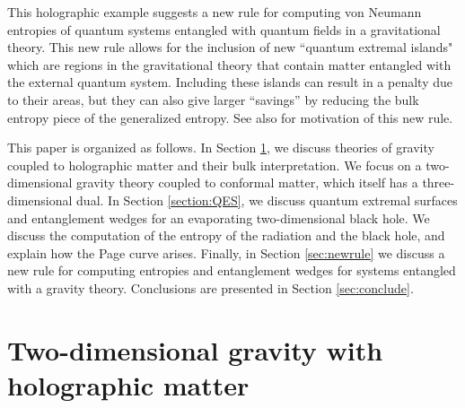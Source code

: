 \documentclass[11pt]{article}
\def\la{\label}
\begin{document}
This holographic example suggests a new rule for computing von Neumann entropies of quantum systems entangled with quantum fields  in a gravitational theory. 
This new rule allows for the inclusion of new ``quantum extremal islands" which are regions in the gravitational theory that contain matter entangled with the external quantum system. 
Including these islands can result in a penalty due to their areas, but they can also give larger ``savings'' by reducing the bulk entropy piece of the generalized entropy. 
See also \cite{Hayden:2018khn,Penington:2019npb}  for motivation of this new rule.

This paper is organized as follows. 
In Section \ref{sec:setup}, we discuss theories of gravity coupled to holographic matter and their bulk interpretation. 
We focus on a two-dimensional gravity theory coupled to conformal matter, which itself has a three-dimensional dual. 
In Section \ref{section:QES}, we discuss quantum extremal surfaces and entanglement wedges for an evaporating two-dimensional black hole. 
We discuss the computation of the entropy of the radiation and the black hole, and explain how the Page curve arises.
Finally, in Section \ref{sec:newrule} we discuss a new rule for computing entropies and entanglement wedges for systems entangled with a gravity theory.  
Conclusions are presented in Section \ref{sec:conclude}.

\section{Two-dimensional gravity with holographic matter}
\label{sec:setup}

 
\end{document}
